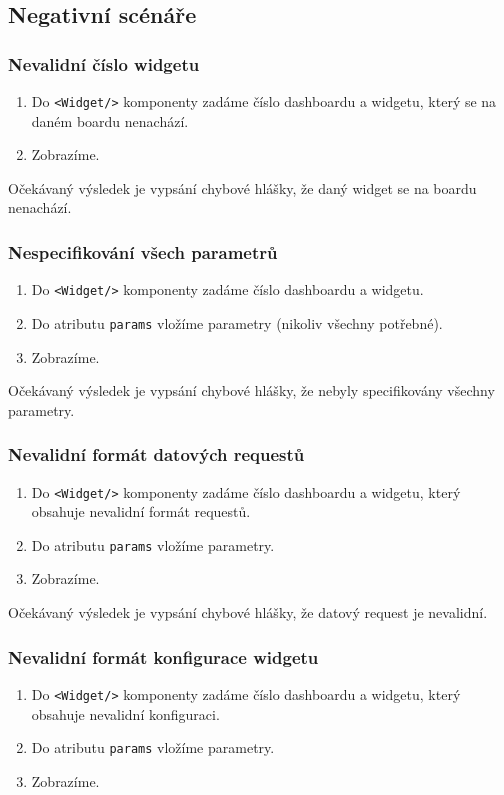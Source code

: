 \documentclass[czech, bc, kiv, he, iso690numb, viewonly]{fasthesis} %
\begin{document}
\subsection{Negativní scénáře}
\subsubsection{Nevalidní číslo widgetu}
\begin{enumerate}
	\item Do \texttt{<Widget/>} komponenty zadáme číslo dashboardu a widgetu, který se na daném boardu nenachází.
	\item Zobrazíme.
\end{enumerate}
Očekávaný výsledek je vypsání chybové hlášky, že daný widget se na boardu nenachází.

\subsubsection{Nespecifikování všech parametrů}
\begin{enumerate}
	\item Do \texttt{<Widget/>} komponenty zadáme číslo dashboardu a widgetu.
	\item Do atributu \texttt{params} vložíme parametry (nikoliv všechny potřebné).
	\item Zobrazíme.
\end{enumerate}
Očekávaný výsledek je vypsání chybové hlášky, že nebyly specifikovány všechny parametry.

\subsubsection{Nevalidní formát datových requestů}
\begin{enumerate}
	\item Do \texttt{<Widget/>} komponenty zadáme číslo dashboardu a widgetu, který obsahuje nevalidní formát requestů.
	\item Do atributu \texttt{params} vložíme parametry.
	\item Zobrazíme.
\end{enumerate}
Očekávaný výsledek je vypsání chybové hlášky, že datový request je nevalidní.

\subsubsection{Nevalidní formát konfigurace widgetu}
\begin{enumerate}
	\item Do \texttt{<Widget/>} komponenty zadáme číslo dashboardu a widgetu, který obsahuje nevalidní konfiguraci.
	\item Do atributu \texttt{params} vložíme parametry.
	\item Zobrazíme.
\end{enumerate}
\end{document}
